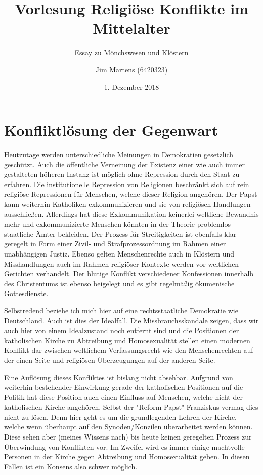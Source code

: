 \documentclass[10pt,a4paper,oneside,ngerman,numbers=noenddot]{scrartcl}
\begin{document}
\author{Jim Martens (6420323)}
\title{Vorlesung Religiöse Konflikte im Mittelalter}
\subtitle{Essay zu Mönchswesen und Klöstern}
\date{1. Dezember 2018}
\maketitle

\section{Konfliktlösung der Gegenwart}

Heutzutage werden unterschiedliche Meinungen in Demokratien gesetzlich geschützt.
Auch die öffentliche Verneinung der Existenz einer wie auch immer gestalteten
höheren Instanz ist möglich ohne Repression durch den Staat zu erfahren. Die
institutionelle Repression von Religionen beschränkt sich auf rein religiöse
Repressionen für Menschen, welche dieser Religion angehören. Der Papst kann
weiterhin Katholiken exkommunizieren und sie von religiösen Handlungen ausschließen.
Allerdings hat diese Exkommunikation keinerlei weltliche Bewandnis mehr und
exkommunizierte Menschen könnten in der Theorie problemlos staatliche Ämter
bekleiden.
Der Prozess für Streitigkeiten ist ebenfalls klar geregelt in Form einer
Zivil- und Strafprozessordnung im Rahmen einer unabhängigen Justiz. Ebenso gelten
Menschenrechte auch in Klöstern und Misshandlungen auch im Rahmen religiöser Kontexte
werden vor weltlichen Gerichten verhandelt.
Der blutige Konflikt verschiedener Konfessionen innerhalb des Christentums ist
ebenso beigelegt und es gibt regelmäßig ökumenische Gottesdienste.

Selbstredend beziehe ich mich hier auf eine rechtsstaatliche Demokratie wie
Deutschland. Auch ist dies der Idealfall. Die Missbrauchsskandale zeigen,
dass wir auch hier von einem Idealzustand noch entfernt sind und die Positionen
der katholischen Kirche zu Abtreibung und Homosexualität stellen einen modernen
Konflikt dar zwischen weltlichem Verfassungsrecht wie den Menschenrechten
auf der einen Seite und religiösen Überzeugungen auf der anderen Seite.

Eine Auflösung dieses Konfliktes ist bislang nicht absehbar. Aufgrund von
weiterhin bestehender Einwirkung gerade der katholischen Positionen auf die
Politik hat diese Position auch einen Einfluss auf Menschen, welche nicht
der katholischen Kirche angehören. Selbst der "Reform-Papst" Franziskus vermag
dies nicht zu lösen. Denn hier geht es um die grundlegenden Lehren der Kirche,
welche wenn überhaupt auf den Synoden/Konzilen überarbeitet werden können. Diese
sehen aber (meines Wissens nach) bis heute keinen geregelten Prozess zur
Überwindung von Konflikten vor. Im Zweifel wird es immer einige machtvolle
Personen in der Kirche gegen Abtreibung und Homosexualität geben. In diesen
Fällen ist ein Konsens also schwer möglich.
\end{document}
